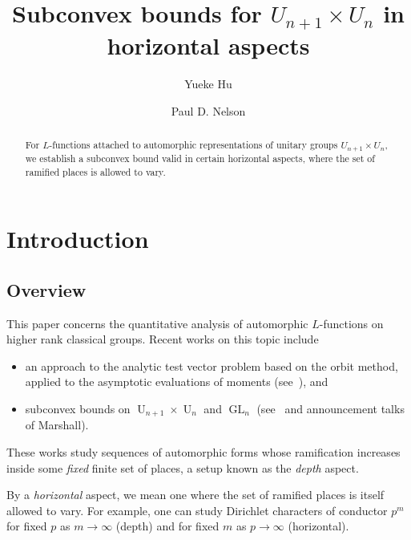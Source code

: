 \documentclass[reqno]{amsart}
\DeclareMathOperator{\GL}{GL}
\DeclareMathOperator{\U}{U}
\theoremstyle{plain} \newtheorem{theorem} {Theorem} \newtheorem{conjecture} {Conjecture} \newtheorem{corollary} [theorem] {Corollary} \newtheorem{proposition} [theorem] {Proposition} \newtheorem{fact} [theorem] {Fact}
\theoremstyle{definition} \newtheorem{definition} [theorem] {Definition}
\theoremstyle{itplain} %
\begin{document}
\title{Subconvex bounds for $U_{n+1}\times U_n$ in horizontal aspects}

\author{Yueke Hu}
\address{YMSC, Tsinghua University}

\author{Paul D. Nelson}
\address{Aarhus University}


\begin{abstract}
  For $L$-functions attached to automorphic representations of unitary groups $U_{n+1}\times U_n$, we establish a subconvex bound valid in certain horizontal aspects, where the set of ramified places is allowed to vary.
\end{abstract}
\maketitle
\tableofcontents

\section{Introduction}

\subsection{Overview}
This paper concerns the quantitative analysis of automorphic $L$-functions on higher rank classical groups.  Recent works on this topic include
\begin{itemize}
\item an approach to the analytic test vector problem based on the orbit method, applied to the asymptotic evaluations of moments (see~\cite{nelson-venkatesh-1}), and
\item subconvex bounds on $\U_{n+1} \times \U_n$ and $\GL_n$ (see~\cite{2020arXiv201202187N, 2021arXiv210915230N} and announcement talks of Marshall).
\end{itemize}
These works study sequences of automorphic forms whose ramification increases inside some \emph{fixed} finite set of places, a setup known as the \emph{depth} aspect.

By a \emph{horizontal} aspect, we mean one where the set of ramified places is itself allowed to vary.  For example, one can study Dirichlet characters of conductor $p^m$ for fixed $p$ as  $m \rightarrow \infty$ (depth) and for fixed $m$ as $p \rightarrow \infty$ (horizontal).
\end{document}
